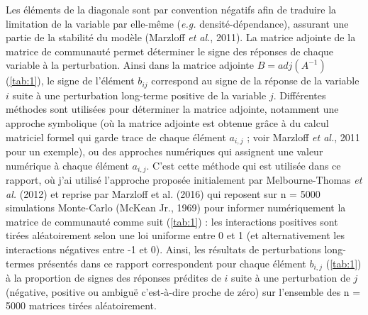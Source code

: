 \documentclass[12pt]{report}
\begin{document}
Les éléments de la diagonale sont par convention négatifs afin de traduire la limitation de la variable par elle-même (\textit{e.g.} densité-dépendance), assurant une partie de la stabilité du modèle (Marzloff \textit{et al.}, 2011). La matrice adjointe de la matrice de communauté permet déterminer le signe des réponses de chaque variable à la perturbation. 
Ainsi dans la matrice adjointe $B = adj (A^{-1})$ (\autoref{tab:1}), le signe de l'élément $b_{ij}$ correspond au signe de la réponse  de la variable $i$ suite à une perturbation long-terme positive de la variable $j$.
\newline\newline
Différentes méthodes sont utilisées pour déterminer la matrice adjointe, notamment une approche symbolique (où la matrice adjointe est obtenue grâce à du calcul matriciel formel qui garde trace de chaque élément $a_{i,j}$ ; voir Marzloff \textit{et al.}, 2011 pour un exemple), ou des approches numériques qui assignent une valeur numérique à chaque élément $a_{i,j}$. C'est cette méthode qui est utilisée dans ce rapport, où j'ai utilisé l'approche proposée initialement par Melbourne-Thomas \textit{et al.} (2012) et reprise par Marzloff et al. (2016) qui reposent sur n = 5000 simulations Monte-Carlo (McKean Jr., 1969) pour informer numériquement la matrice de communauté comme suit (\autoref{tab:1}) : les interactions positives sont tirées aléatoirement selon une loi uniforme entre 0 et 1 (et alternativement les interactions négatives entre -1 et 0). Ainsi, les résultats de perturbations long-termes présentés dans ce rapport correspondent pour chaque élément $b_{i,j}$ (\autoref{tab:1}) à la proportion de signes des réponses prédites de $i$ suite à une perturbation de $j$ (négative, positive ou ambiguë c'est-à-dire proche de zéro) sur l'ensemble des n = 5000 matrices tirées aléatoirement.


\end{document}
